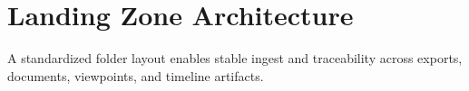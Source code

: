 \section{Landing Zone Architecture}
A standardized folder layout enables stable ingest and traceability across exports, documents, viewpoints, and timeline artifacts.

